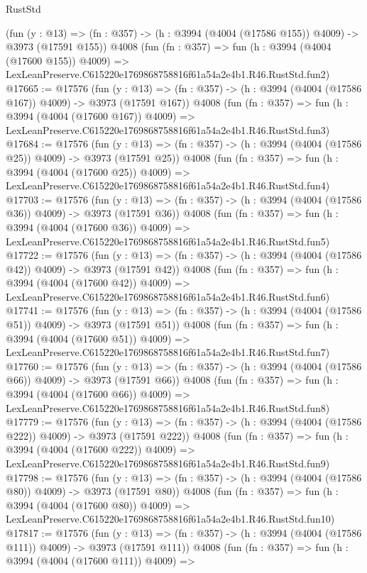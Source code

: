 \begin{lexlean}{RustStd}
\begin{coremodule}
    (fun (y : @13) => (fn : @357) -> (h : @3994 (@4004 (@17586 @155)) @4009) -> @3973 (@17591 @155))
    @4008
    (fun (fn : @357) =>
    fun (h : @3994 (@4004 (@17600 @155)) @4009) =>
    LexLeanPreserve.C615220e1769868758816f61a54a2e4b1.R46.RustStd.fun2)
@17665 := @17576
    (fun (y : @13) => (fn : @357) -> (h : @3994 (@4004 (@17586 @167)) @4009) -> @3973 (@17591 @167))
    @4008
    (fun (fn : @357) =>
    fun (h : @3994 (@4004 (@17600 @167)) @4009) =>
    LexLeanPreserve.C615220e1769868758816f61a54a2e4b1.R46.RustStd.fun3)
@17684 := @17576
    (fun (y : @13) => (fn : @357) -> (h : @3994 (@4004 (@17586 @25)) @4009) -> @3973 (@17591 @25))
    @4008
    (fun (fn : @357) =>
    fun (h : @3994 (@4004 (@17600 @25)) @4009) =>
    LexLeanPreserve.C615220e1769868758816f61a54a2e4b1.R46.RustStd.fun4)
@17703 := @17576
    (fun (y : @13) => (fn : @357) -> (h : @3994 (@4004 (@17586 @36)) @4009) -> @3973 (@17591 @36))
    @4008
    (fun (fn : @357) =>
    fun (h : @3994 (@4004 (@17600 @36)) @4009) =>
    LexLeanPreserve.C615220e1769868758816f61a54a2e4b1.R46.RustStd.fun5)
@17722 := @17576
    (fun (y : @13) => (fn : @357) -> (h : @3994 (@4004 (@17586 @42)) @4009) -> @3973 (@17591 @42))
    @4008
    (fun (fn : @357) =>
    fun (h : @3994 (@4004 (@17600 @42)) @4009) =>
    LexLeanPreserve.C615220e1769868758816f61a54a2e4b1.R46.RustStd.fun6)
@17741 := @17576
    (fun (y : @13) => (fn : @357) -> (h : @3994 (@4004 (@17586 @51)) @4009) -> @3973 (@17591 @51))
    @4008
    (fun (fn : @357) =>
    fun (h : @3994 (@4004 (@17600 @51)) @4009) =>
    LexLeanPreserve.C615220e1769868758816f61a54a2e4b1.R46.RustStd.fun7)
@17760 := @17576
    (fun (y : @13) => (fn : @357) -> (h : @3994 (@4004 (@17586 @66)) @4009) -> @3973 (@17591 @66))
    @4008
    (fun (fn : @357) =>
    fun (h : @3994 (@4004 (@17600 @66)) @4009) =>
    LexLeanPreserve.C615220e1769868758816f61a54a2e4b1.R46.RustStd.fun8)
@17779 := @17576
    (fun (y : @13) => (fn : @357) -> (h : @3994 (@4004 (@17586 @222)) @4009) -> @3973 (@17591 @222))
    @4008
    (fun (fn : @357) =>
    fun (h : @3994 (@4004 (@17600 @222)) @4009) =>
    LexLeanPreserve.C615220e1769868758816f61a54a2e4b1.R46.RustStd.fun9)
@17798 := @17576
    (fun (y : @13) => (fn : @357) -> (h : @3994 (@4004 (@17586 @80)) @4009) -> @3973 (@17591 @80))
    @4008
    (fun (fn : @357) =>
    fun (h : @3994 (@4004 (@17600 @80)) @4009) =>
    LexLeanPreserve.C615220e1769868758816f61a54a2e4b1.R46.RustStd.fun10)
@17817 := @17576
    (fun (y : @13) => (fn : @357) -> (h : @3994 (@4004 (@17586 @111)) @4009) -> @3973 (@17591 @111))
    @4008
    (fun (fn : @357) =>
    fun (h : @3994 (@4004 (@17600 @111)) @4009) =>

\end{coremodule}
\end{lexlean}
